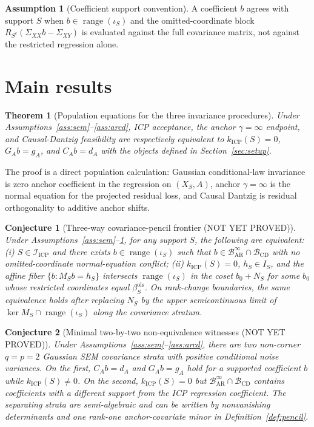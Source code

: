 \documentclass[11pt]{article}
\theoremstyle{definition}
\newtheorem{assumption}{Assumption}
\theoremstyle{plain}
\newtheorem{theorem}{Theorem}
\newtheorem{conjecture}{Conjecture}
\theoremstyle{remark}
\begin{document}
\begin{assumption}[Coefficient support convention]\label{ass:support}
A coefficient $b$ agrees with support $S$ when $b\in\operatorname{range}(\iota_S)$ and the omitted-coordinate block $R_{S^c}(\Sigma_{XX}b-\Sigma_{XY})$ is evaluated against the full covariance matrix, not against the restricted regression alone.
\end{assumption}

\section{Main results}
\begin{theorem}[Population equations for the three invariance procedures]\label{thm:equations}
Under Assumptions~\ref{ass:sem}--\ref{ass:arcd}, ICP acceptance, the anchor $\gamma=\infty$ endpoint, and Causal-Dantzig feasibility are respectively equivalent to $k_{\mathrm{ICP}}(S)=0$, $G_A b=g_A$, and $C_A b=d_A$ with the objects defined in Section~\ref{sec:setup}.
\end{theorem}
The proof is a direct population calculation: Gaussian conditional-law invariance is zero anchor coefficient in the regression on $(X_S,A)$, anchor $\gamma=\infty$ is the normal equation for the projected residual loss, and Causal Dantzig is residual orthogonality to additive anchor shifts.

\begin{conjecture}[Three-way covariance-pencil frontier (NOT YET PROVED)]\label{conj:frontier}
Under Assumptions~\ref{ass:sem}--\ref{ass:support}, for any support $S$, the following are equivalent: (i) $S\in\mathcal I_{\mathrm{ICP}}$ and there exists $b\in\operatorname{range}(\iota_S)$ such that $b\in\mathcal B_{\mathrm{AR}}^\infty\cap\mathcal B_{\mathrm{CD}}$ with no omitted-coordinate normal-equation conflict; (ii) $k_{\mathrm{ICP}}(S)=0$, $h_S\in I_S$, and the affine fiber $\{b:M_Sb=h_S\}$ intersects $\operatorname{range}(\iota_S)$ in the coset $b_0+N_S$ for some $b_0$ whose restricted coordinates equal $\beta_S^{\mathrm{ols}}$. On rank-change boundaries, the same equivalence holds after replacing $N_S$ by the upper semicontinuous limit of $\ker M_S\cap\operatorname{range}(\iota_S)$ along the covariance stratum.
\end{conjecture}

\begin{conjecture}[Minimal two-by-two non-equivalence witnesses (NOT YET PROVED)]\label{conj:witness}
Under Assumptions~\ref{ass:sem}--\ref{ass:arcd}, there are two non-corner $q=p=2$ Gaussian SEM covariance strata with positive conditional noise variances. On the first, $C_A b=d_A$ and $G_A b=g_A$ hold for a supported coefficient $b$ while $k_{\mathrm{ICP}}(S)\ne0$. On the second, $k_{\mathrm{ICP}}(S)=0$ but $\mathcal B_{\mathrm{AR}}^\infty\cap\mathcal B_{\mathrm{CD}}$ contains coefficients with a different support from the ICP regression coefficient. The separating strata are semi-algebraic and can be written by nonvanishing determinants and one rank-one anchor-covariate minor in Definition~\ref{def:pencil}.
\end{conjecture}
\end{document}
